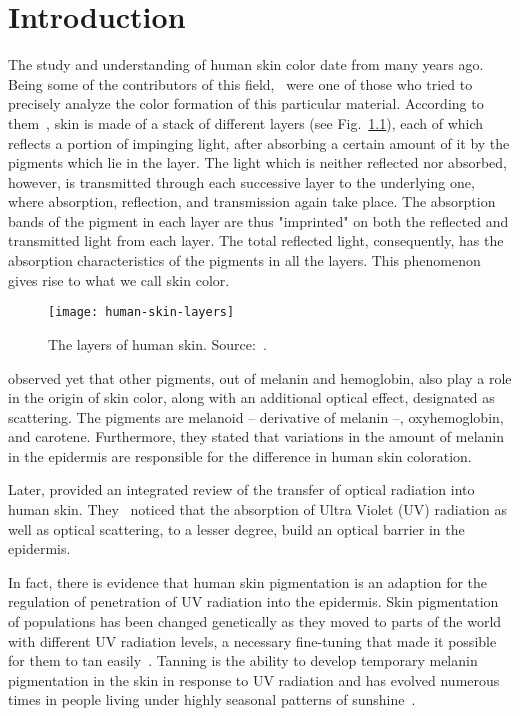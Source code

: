 \chapter{Introduction}
\label{cap:introducao}
The study and understanding of human skin color date from many years ago. Being some of the contributors of this field,~\citet{edwards:39} were one of those who tried to precisely analyze the color formation of this particular material. According to them~\citep{edwards:39}, skin is made of a stack of different layers (see Fig.~\ref{fig:human-skin-layers}), each of which reflects a portion of impinging light, after absorbing a certain amount of it by the pigments which lie in the layer. The light which is neither reflected nor absorbed, however, is transmitted through each successive layer to the underlying one, where absorption, reflection, and transmission again take place. The absorption bands of the pigment in each layer are thus "imprinted" on both the reflected and transmitted light from each layer. The total reflected light, consequently, has the absorption characteristics of the pigments in all the layers. This phenomenon gives rise to what we call skin color.


\begin{figure}[!hb]
  \centering
  \texttt{[image: human-skin-layers]}
  \caption[The layers of human skin]{The layers of human skin. Source:~\citet{nanette:18}.}
  \label{fig:human-skin-layers}
\end{figure}

\citet{edwards:39} observed yet that other pigments, out of melanin and hemoglobin, also play a role in the origin of skin color, along with an additional optical effect, designated as scattering. The pigments are melanoid -- derivative of melanin --, oxyhemoglobin, and carotene. Furthermore, they stated that variations in the amount of melanin in the epidermis are responsible for the difference in human skin coloration.

Later, \citet{anderson:81} provided an integrated review of the transfer of optical radiation into human skin. They~\citep{anderson:81} noticed that the absorption of Ultra Violet (UV) radiation as well as optical scattering, to a lesser degree, build an optical barrier in the epidermis.

In fact, there is evidence that human skin pigmentation is an adaption for the regulation of penetration of UV radiation into the epidermis. Skin pigmentation of populations has been changed genetically as they moved to parts of the world with different UV radiation levels, a necessary fine-tuning that made it possible for them to tan easily~\citep{jablonski:00}. Tanning is the ability to develop temporary melanin pigmentation in the skin in response to UV radiation and has evolved numerous times in people living under highly seasonal patterns of sunshine~\citep{jablonski:10}.


